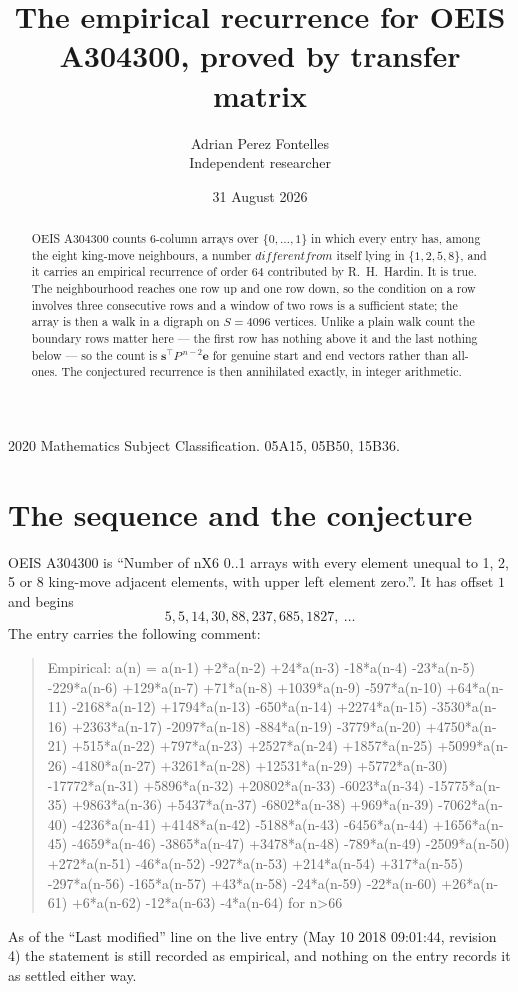 \documentclass[11pt,a4paper]{article}
\title{The empirical recurrence for OEIS A304300, proved by transfer matrix}
\author{Adrian Perez Fontelles\\ \small Independent researcher}
\date{31 August 2026}
\theoremstyle{plain}
\theoremstyle{definition}
\begin{document}
\maketitle

\begin{abstract}
OEIS A304300 counts $6$-column arrays over $\{0,\dots,1\}$ in which every entry has,
among the eight king-move neighbours, a number $different from$ itself lying in $\{1,2,5,8\}$, and it carries an empirical
recurrence of order $64$ contributed by R.~H.~Hardin. It is true. The neighbourhood
reaches one row up and one row down, so the condition on a row involves three consecutive
rows and a window of two rows is a sufficient state; the array is then a walk in a digraph
on $S=4096$ vertices. Unlike a plain walk count the boundary rows matter here --- the first
row has nothing above it and the last nothing below --- so the count is
$\mathbf{s}^{\!\top}P^{\,n-2}\mathbf{e}$ for genuine start and end vectors rather than
all-ones. The conjectured recurrence is then annihilated exactly, in integer arithmetic.
\end{abstract}

\noindent\small 2020 Mathematics Subject Classification. 05A15, 05B50, 15B36.\normalsize

\section{The sequence and the conjecture}

OEIS A304300 is ``Number of nX6 0..1 arrays with every element unequal to 1, 2, 5 or 8 king-move adjacent elements, with upper left element zero.''. It has offset
$1$ and begins
\[
5, 5, 14, 30, 88, 237, 685, 1827,\ \dots
\]
The entry carries the following comment:
\begin{quote}\small
Empirical: a(n) = a(n-1) +2*a(n-2) +24*a(n-3) -18*a(n-4) -23*a(n-5) -229*a(n-6) +129*a(n-7) +71*a(n-8) +1039*a(n-9) -597*a(n-10) +64*a(n-11) -2168*a(n-12) +1794*a(n-13) -650*a(n-14) +2274*a(n-15) -3530*a(n-16) +2363*a(n-17) -2097*a(n-18) -884*a(n-19) -3779*a(n-20) +4750*a(n-21) +515*a(n-22) +797*a(n-23) +2527*a(n-24) +1857*a(n-25) +5099*a(n-26) -4180*a(n-27) +3261*a(n-28) +12531*a(n-29) +5772*a(n-30) -17772*a(n-31) +5896*a(n-32) +20802*a(n-33) -6023*a(n-34) -15775*a(n-35) +9863*a(n-36) +5437*a(n-37) -6802*a(n-38) +969*a(n-39) -7062*a(n-40) -4236*a(n-41) +4148*a(n-42) -5188*a(n-43) -6456*a(n-44) +1656*a(n-45) -4659*a(n-46) -3865*a(n-47) +3478*a(n-48) -789*a(n-49) -2509*a(n-50) +272*a(n-51) -46*a(n-52) -927*a(n-53) +214*a(n-54) +317*a(n-55) -297*a(n-56) -165*a(n-57) +43*a(n-58) -24*a(n-59) -22*a(n-60) +26*a(n-61) +6*a(n-62) -12*a(n-63) -4*a(n-64) for n>66
\end{quote}
As of the ``Last modified'' line on the live entry (May 10 2018 09:01:44, revision
4) the statement is still recorded as empirical, and nothing on the entry
records it as settled either way.
\end{document}
